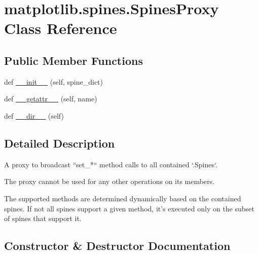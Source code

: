 \hypertarget{classmatplotlib_1_1spines_1_1SpinesProxy}{}\section{matplotlib.\+spines.\+Spines\+Proxy Class Reference}
\label{classmatplotlib_1_1spines_1_1SpinesProxy}
\subsection*{Public Member Functions}
\begin{DoxyCompactItemize}
\item 
def \hyperlink{classmatplotlib_1_1spines_1_1SpinesProxy_abe5da2c3583285aca203a3c152d4a3ea}{\+\_\+\+\_\+init\+\_\+\+\_\+} (self, spine\+\_\+dict)
\item 
def \hyperlink{classmatplotlib_1_1spines_1_1SpinesProxy_a7e8841c7e96df07feb9e0fb354fa537f}{\+\_\+\+\_\+getattr\+\_\+\+\_\+} (self, name)
\item 
def \hyperlink{classmatplotlib_1_1spines_1_1SpinesProxy_afb18d1d18699eb1deb623830914c8ed5}{\+\_\+\+\_\+dir\+\_\+\+\_\+} (self)
\end{DoxyCompactItemize}


\subsection{Detailed Description}
\begin{DoxyVerb}A proxy to broadcast ``set_*`` method calls to all contained `.Spines`.

The proxy cannot be used for any other operations on its members.

The supported methods are determined dynamically based on the contained
spines. If not all spines support a given method, it's executed only on
the subset of spines that support it.
\end{DoxyVerb}
 

\subsection{Constructor \& Destructor Documentation}
\mbox{\label{classmatplotlib_1_1spines_1_1SpinesProxy_abe5da2c3583285aca203a3c152d4a3ea}} 
